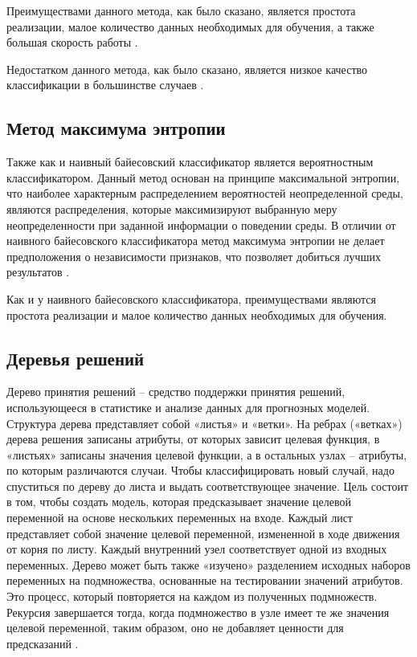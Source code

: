 \documentclass[a4paper,14pt, unknownkeysallowed]{extreport}
\begin{document}
	Преимуществами данного метода, как было сказано, является простота реализации, малое количество данных необходимых для
	обучения, а также большая скорость работы \cite{Samigulin, Noskov}.
	
	Недостатком данного метода, как было сказано, является низкое качество классификации в большинстве случаев \cite{Samigulin}.
	
	\subsection{Метод максимума энтропии}
	
	Также как и наивный байесовский классификатор является вероятностным классификатором. Данный метод основан на принципе максимальной энтропии, что наиболее характерным распределением вероятностей неопределенной среды, являются распределения, которые максимизируют выбранную меру неопределенности при заданной информации о поведении среды. В отличии от наивного байесовского классификатора метод максимума энтропии не делает предположения о независимости признаков, что позволяет добиться лучших результатов \cite{Samigulin}. 
	
	Как и у наивного байесовского классификатора, преимуществами являются простота реализации и малое количество данных необходимых для обучения.
	
	\subsection{Деревья решений}
	
	Дерево принятия решений -- средство поддержки принятия решений, использующееся в статистике и анализе данных для прогнозных моделей. Структура дерева представляет собой «листья» и «ветки». На ребрах («ветках») дерева решения записаны атрибуты, от которых зависит целевая функция, в «листьях» записаны значения целевой функции, а в остальных узлах -- атрибуты, по которым различаются случаи. Чтобы классифицировать новый случай, надо спуститься по дереву до листа и выдать соответствующее значение. Цель состоит в том, чтобы создать модель, которая предсказывает значение целевой переменной на основе нескольких переменных на входе. Каждый лист представляет собой значение целевой переменной, измененной в ходе движения от корня по листу. Каждый внутренний узел соответствует одной из входных переменных. Дерево может быть также «изучено» разделением исходных наборов переменных на подмножества, основанные на тестировании значений атрибутов. Это процесс, который повторяется на каждом из полученных подмножеств. Рекурсия завершается тогда, когда подмножество в узле имеет те же значения целевой переменной, таким образом, оно не добавляет ценности для предсказаний \cite{Noskov}.
	
\end{document}
